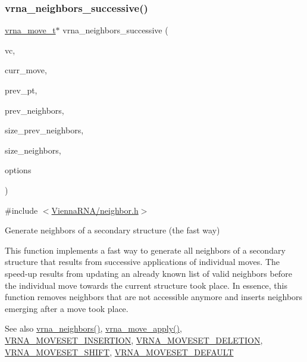 \subsubsection{\texorpdfstring{vrna\+\_\+neighbors\+\_\+successive()}{vrna\_neighbors\_successive()}}
{\footnotesize\ttfamily \hyperlink{group__neighbors_structvrna__move__s}{vrna\+\_\+move\+\_\+t}$\ast$ vrna\+\_\+neighbors\+\_\+successive (\begin{DoxyParamCaption}\item[{const \hyperlink{group__fold__compound_ga1b0cef17fd40466cef5968eaeeff6166}{vrna\+\_\+fold\+\_\+compound\+\_\+t} $\ast$}]{vc,  }\item[{const \hyperlink{group__neighbors_structvrna__move__s}{vrna\+\_\+move\+\_\+t} $\ast$}]{curr\+\_\+move,  }\item[{const short $\ast$}]{prev\+\_\+pt,  }\item[{const \hyperlink{group__neighbors_structvrna__move__s}{vrna\+\_\+move\+\_\+t} $\ast$}]{prev\+\_\+neighbors,  }\item[{int}]{size\+\_\+prev\+\_\+neighbors,  }\item[{int $\ast$}]{size\+\_\+neighbors,  }\item[{unsigned int}]{options }\end{DoxyParamCaption})}



{\ttfamily \#include $<$\hyperlink{neighbor_8h}{Vienna\+R\+N\+A/neighbor.\+h}$>$}



Generate neighbors of a secondary structure (the fast way) 

This function implements a fast way to generate all neighbors of a secondary structure that results from successive applications of individual moves. The speed-\/up results from updating an already known list of valid neighbors before the individual move towards the current structure took place. In essence, this function removes neighbors that are not accessible anymore and inserts neighbors emerging after a move took place.

\begin{DoxySeeAlso}{See also}
\hyperlink{group__neighbors_gab1473d856b15da2120fe648977798ad5}{vrna\+\_\+neighbors()}, \hyperlink{group__neighbors_gacdbc5f609b46aeb07d2c7e015677a1e0}{vrna\+\_\+move\+\_\+apply()}, \hyperlink{group__neighbors_gaf39028db9c70d3be528929182a3f2d5a}{V\+R\+N\+A\+\_\+\+M\+O\+V\+E\+S\+E\+T\+\_\+\+I\+N\+S\+E\+R\+T\+I\+ON}, \hyperlink{group__neighbors_gac05db9392c6647e3e9a6982096c5b384}{V\+R\+N\+A\+\_\+\+M\+O\+V\+E\+S\+E\+T\+\_\+\+D\+E\+L\+E\+T\+I\+ON}, \hyperlink{group__neighbors_ga68ea27c81de4b74e48b775c04052590b}{V\+R\+N\+A\+\_\+\+M\+O\+V\+E\+S\+E\+T\+\_\+\+S\+H\+I\+FT}, \hyperlink{group__neighbors_gaa5ffec4dd0d02df320f123e6888154d1}{V\+R\+N\+A\+\_\+\+M\+O\+V\+E\+S\+E\+T\+\_\+\+D\+E\+F\+A\+U\+LT}
\end{DoxySeeAlso}

